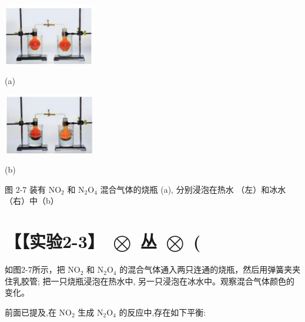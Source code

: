 \documentclass[10pt]{article}
\begin{document}
\begin{center}
\includegraphics[max width=0.3\textwidth]{images/0190da9d-8bfd-732f-bc2c-0b21d0f13b91_44_421106.jpg}
\end{center}

(a)

\begin{center}
\includegraphics[max width=0.3\textwidth]{images/0190da9d-8bfd-732f-bc2c-0b21d0f13b91_44_256867.jpg}
\end{center}

(b)

图 2-7 装有 \({\mathrm{{NO}}}_{2}\) 和 \({\mathrm{N}}_{2}{\mathrm{O}}_{4}\) 混合气体的烧瓶 (a), 分别浸泡在热水 （左）和冰水（右）中（b）

\section*{【【实验2-3】 \(\bigotimes\) 丛 \(\bigotimes\) (}

如图2-7所示，把 \({\mathrm{{NO}}}_{2}\) 和 \({\mathrm{N}}_{2}{\mathrm{O}}_{4}\) 的混合气体通入两只连通的烧瓶，然后用弹簧夹夹住乳胶管; 把一只烧瓶浸泡在热水中, 另一只浸泡在冰水中。观察混合气体颜色的变化。

\begin{center}
\end{center}

前面已提及,在 \({\mathrm{{NO}}}_{2}\) 生成 \({\mathrm{N}}_{2}{\mathrm{O}}_{4}\) 的反应中,存在如下平衡:
\end{document}

